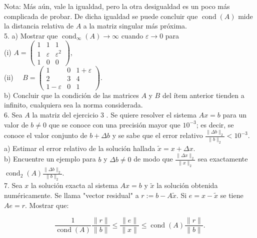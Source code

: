 \documentclass[10pt]{book}
\begin{document}
Nota: Más aún, vale la igualdad, pero la otra desigualdad es un poco más complicada de probar. De dicha igualdad se puede concluir que $\operatorname{cond}(A)$ mide la distancia relativa de $A$ a la matriz singular más próxima.\\
5. a) Mostrar que $\operatorname{cond}_{\infty}(A) \rightarrow \infty$ cuando $\varepsilon \rightarrow 0$ para\\
(i) $A=\left(\begin{array}{ccc}1 & 1 & 1 \\ 1 & \varepsilon & \varepsilon^{2} \\ 1 & 0 & 0\end{array}\right)$,\\
(ii) $\quad B=\left(\begin{array}{ccc}1 & 0 & 1+\varepsilon \\ 2 & 3 & 4 \\ 1-\varepsilon & 0 & 1\end{array}\right)$.\\
b) Concluir que la condición de las matrices $A$ y $B$ del ítem anterior tienden a infinito, cualquiera sea la norma considerada.\\
6. Sea $A$ la matriz del ejercicio 3 . Se quiere resolver el sistema $A x=b$ para un valor de $b \neq 0$ que se conoce con una precisión mayor que $10^{-3}$; es decir, se conoce el valor conjunto de $b+\Delta b$ y se sabe que el error relativo $\frac{\|\Delta b\|_{2}}{\|b\|_{2}}<10^{-3}$.\\
a) Estimar el error relativo de la solución hallada $\tilde{x}=x+\Delta x$.\\
b) Encuentre un ejemplo para $b$ y $\Delta b \neq 0$ de modo que $\frac{\|\Delta x\|_{2}}{\|x\|_{2}}$ sea exactamente $\operatorname{cond}_{2}(A) \frac{\|\Delta b\|_{2}}{\|b\|_{2}}$.\\
7. Sea $x$ la solución exacta al sistema $A x=b$ y $\tilde{x}$ la solución obtenida numéricamente. Se llama "vector residual" a $r:=b-A \tilde{x}$. Si $e=x-\tilde{x}$ se tiene $A e=r$. Mostrar que:

$$
\frac{1}{\operatorname{cond}(A)} \frac{\|r\|}{\|b\|} \leq \frac{\|e\|}{\|x\|} \leq \operatorname{cond}(A) \frac{\|r\|}{\|b\|} .
$$
\end{document}
